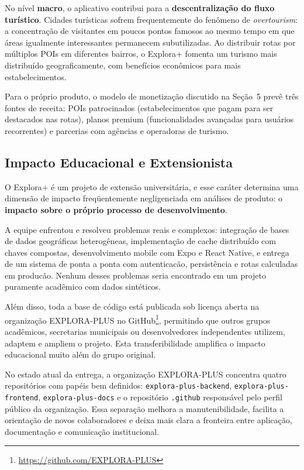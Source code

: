 \documentclass[12pt, a4paper]{article}
\begin{document}
No n\'ivel \textbf{macro}, o aplicativo contribui para a \textbf{descentraliza\c{c}\~ao do fluxo tur\'istico}. Cidades tur\'isticas sofrem frequentemente do fen\^omeno de \textit{overtourism}: a concentra\c{c}\~ao de visitantes em poucos pontos famosos ao mesmo tempo em que \'areas igualmente interessantes permanecem subutilizadas. Ao distribuir rotas por m\'ultiplos POIs em diferentes bairros, o Explora+ fomenta um turismo mais distribu\'ido geograficamente, com benef\'icios econ\^omicos para mais estabelecimentos.

Para o pr\'oprio produto, o modelo de monetiza\c{c}\~ao discutido na Se\c{c}\~ao~5 prev\^e tr\^es fontes de receita: POIs patrocinados (estabelecimentos que pagam para ser destacados nas rotas), planos premium (funcionalidades avan\c{c}adas para usu\'arios recorrentes) e parcerias com ag\^encias e operadoras de turismo.

\subsection{Impacto Educacional e Extensionista}

O Explora+ \'e um projeto de extens\~ao universit\'aria, e esse car\'ater determina uma dimens\~ao de impacto freq\"uentemente negligenciada em an\'alises de produto: o \textbf{impacto sobre o pr\'oprio processo de desenvolvimento}.

A equipe enfrentou e resolveu problemas reais e complexos: integra\c{c}\~ao de bases de dados geogr\'aficas heterog\^eneas, implementa\c{c}\~ao de cache distribu\'ido com chaves compostas, desenvolvimento mobile com Expo e React Native, e entrega de um sistema de ponta a ponta com autenticac\~ao, persist\^encia e rotas calculadas em produc\~ao. Nenhum desses problemas seria encontrado em um projeto puramente acad\^emico com dados sint\'eticos.

Al\'em disso, toda a base de c\'odigo est\'a publicada sob licen\c{c}a aberta na organiza\c{c}\~ao EXPLORA-PLUS no GitHub\footnote{\url{https://github.com/EXPLORA-PLUS}}, permitindo que outros grupos acad\^emicos, secretarias municipais ou desenvolvedores independentes utilizem, adaptem e ampliem o projeto. Esta transferibilidade amplifica o impacto educacional muito al\'em do grupo original.

No estado atual da entrega, a organiza\c{c}\~ao EXPLORA-PLUS concentra quatro reposit\'orios com pap\'eis bem definidos: \texttt{explora-plus-backend}, \texttt{explora-plus-frontend}, \texttt{explora-plus-docs} e o reposit\'orio \texttt{.github} respons\'avel pelo perfil p\'ublico da organiza\c{c}\~ao. Essa separa\c{c}\~ao melhora a manutenibilidade, facilita a orienta\c{c}\~ao de novos colaboradores e deixa mais clara a fronteira entre aplica\c{c}\~ao, documenta\c{c}\~ao e comunica\c{c}\~ao institucional.
\end{document}
